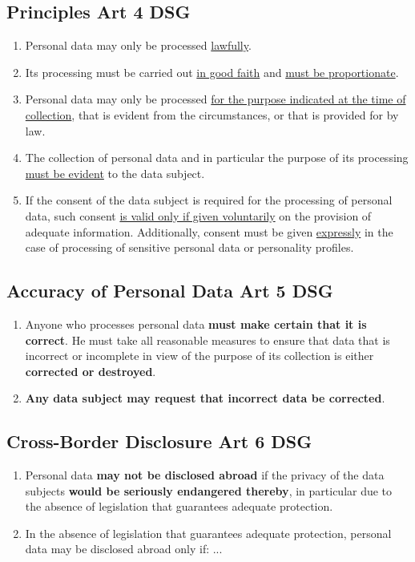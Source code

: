 \documentclass[11pt]{article}
\theoremstyle{definition}
\begin{document}
\subsection{Principles Art 4 DSG}
\begin{enumerate}[label=\arabic*]
	\item Personal data may only be processed \underline{lawfully}.
	\item Its processing must be carried out \underline{in good faith} and \underline{must be proportionate}.
	\item Personal data may only be processed \underline{for the purpose indicated at the time of collection}, that is evident from the circumstances, or that is provided for by law.
	\item The collection of personal data and in particular the purpose of its processing \underline{must be evident} to the data subject.
	\item If the consent of the data subject is required for the processing of personal data, such consent \underline{is valid only if given voluntarily} on the provision of adequate information. Additionally, consent must be given \underline{expressly} in the case of processing of sensitive personal data or personality profiles.
\end{enumerate}

\subsection{Accuracy of Personal Data Art 5 DSG}
\begin{enumerate}[label=\arabic*]
	\item Anyone who processes personal data \textbf{must make certain that it is correct}. He must take all reasonable measures to ensure that data that is incorrect or incomplete in view of the purpose of its collection is either \textbf{corrected or destroyed}. 
	\item \textbf{Any data subject may request that incorrect data be corrected}.
\end{enumerate}

\subsection{Cross-Border Disclosure Art 6 DSG}
\begin{enumerate}[label=\arabic*]
	\item Personal data \textbf{may not be disclosed abroad} if the privacy of the data subjects \textbf{would be seriously endangered thereby}, in particular due to the absence of legislation that guarantees adequate protection.
	\item In the absence of legislation that guarantees adequate protection, personal data may be disclosed abroad only if: ...
\end{enumerate}
\end{document}
